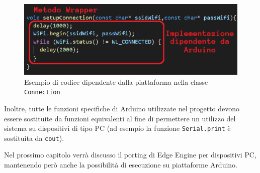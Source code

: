 \begin{figure}[H]
	\centering
	\includegraphics[width=\linewidth]{pics/arduinodependent}
	\caption{Esempio di codice dipendente dalla piattaforma nella classe \texttt{Connection}}
	\label{arduinodep}
\end{figure}

Inoltre, tutte le funzioni specifiche di Arduino utilizzate nel progetto devono essere sostituite da funzioni equivalenti al fine di permettere un utilizzo del sistema su dispositivi di tipo PC (ad esempio la funzione \texttt{Serial.print} è sostituita da \texttt{cout}).

Nel prossimo capitolo verrà discusso il porting di Edge Engine per dispositivi PC, mantenendo però anche la possibilità di esecuzione su piattaforme Arduino.
